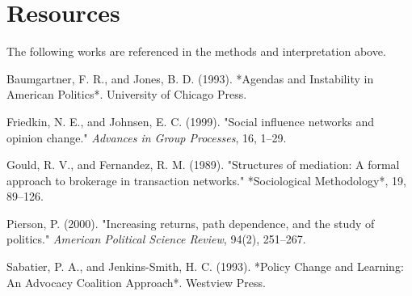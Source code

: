 \documentclass[11pt,a4paper]{article}
\begin{document}
\section{Resources}

The following works are referenced in the methods and interpretation
above.

Baumgartner, F. R., and Jones, B. D. (1993). *Agendas and Instability in
American Politics*. University of Chicago Press.

Friedkin, N. E., and Johnsen, E. C. (1999). "Social influence networks
and opinion change." \textit{Advances in Group Processes}, 16, 1--29.

Gould, R. V., and Fernandez, R. M. (1989). "Structures of mediation: A
formal approach to brokerage in transaction networks." *Sociological
Methodology*, 19, 89--126.

Pierson, P. (2000). "Increasing returns, path dependence, and the study
of politics." \textit{American Political Science Review}, 94(2), 251--267.

Sabatier, P. A., and Jenkins-Smith, H. C. (1993). *Policy Change and
Learning: An Advocacy Coalition Approach*. Westview Press.
\end{document}
